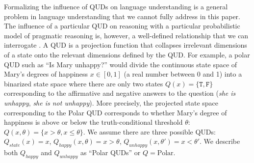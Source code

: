\documentclass[floatsintext,doc]{apa6}
\begin{document}
Formalizing the influence of QUDs on language understanding is a general problem in language understanding that we cannot fully address in this paper. 
The influence of a particular QUD on reasoning with a particular probabilistic model of pragmatic reasoning is, however, a well-defined relationship that we can interrogate \cite{kao2014nonliteral, hawkins2015you, hawkins_goodman_2017}. 
A QUD is a projection function that collapses irrelevant dimensions of a state onto the relevant dimensions defined by the QUD. 
For example, a polar QUD such as ``Is Mary unhappy?'' would divide the continuous state space of Mary's degrees of happiness $x \in [0, 1]$  (a real number between 0 and 1) into a binarized state space where there are only two states $Q(x) = \{\texttt{T}, \texttt{F}\}$ corresponding to the affirmative and negative answers to the question (\emph{she is unhappy}, \emph{she is not unhappy}). 
More precisely, the projected state space corresponding to the Polar QUD corresponds to whether Mary's degree of happiness is above or below the truth-conditional threshold $\theta$:  $Q(x, \theta) = \{x > \theta, x \leq \theta\}$.  
We assume there are three possible QUDs: $Q_{state}(x) = x$, $Q_{happy}(x, \theta) = x > \theta$, $Q_{unhappy}(x, \theta') = x< \theta'$. We describe both $Q_{happy}$ and $Q_{unhappy}$ as ``Polar QUDs'' or $Q = \text{Polar}$. 
 
\end{document}
